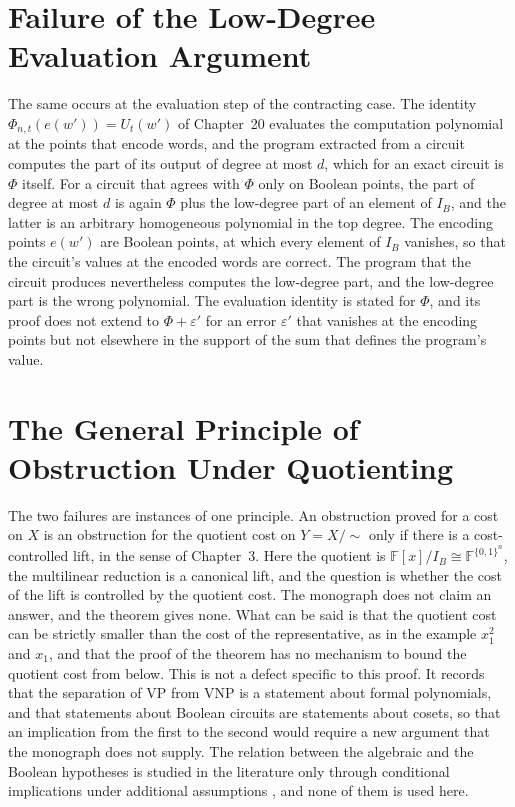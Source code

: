\documentclass[11pt,letterpaper]{report}
\theoremstyle{plain}
\theoremstyle{definition}
\theoremstyle{remark}
\newcommand{\VP}{\mathrm{VP}}
\newcommand{\VNP}{\mathrm{VNP}}
\begin{document}
\section{Failure of the Low-Degree Evaluation Argument}

The same occurs at the evaluation step of the contracting case. The identity $\Phi_{n,t}(e(w'))=U_t(w')$ of Chapter~20 evaluates the computation polynomial at the points that encode words, and the program extracted from a circuit computes the part of its output of degree at most $d$, which for an exact circuit is $\Phi$ itself. For a circuit that agrees with $\Phi$ only on Boolean points, the part of degree at most $d$ is again $\Phi$ plus the low-degree part of an element of $I_B$, and the latter is an arbitrary homogeneous polynomial in the top degree. The encoding points $e(w')$ are Boolean points, at which every element of $I_B$ vanishes, so that the circuit's values at the encoded words are correct. The program that the circuit produces nevertheless computes the low-degree part, and the low-degree part is the wrong polynomial. The evaluation identity is stated for $\Phi$, and its proof does not extend to $\Phi+\varepsilon'$ for an error $\varepsilon'$ that vanishes at the encoding points but not elsewhere in the support of the sum that defines the program's value.

\section{The General Principle of Obstruction Under Quotienting}

The two failures are instances of one principle. An obstruction proved for a cost on $X$ is an obstruction for the quotient cost on $Y=X/{\sim}$ only if there is a cost-controlled lift, in the sense of Chapter~3. Here the quotient is $\mathbb F[x]/I_B\cong\mathbb F^{\{0,1\}^n}$, the multilinear reduction is a canonical lift, and the question is whether the cost of the lift is controlled by the quotient cost. The monograph does not claim an answer, and the theorem gives none. What can be said is that the quotient cost can be strictly smaller than the cost of the representative, as in the example $x_1^2$ and $x_1$, and that the proof of the theorem has no mechanism to bound the quotient cost from below. This is not a defect specific to this proof. It records that the separation of $\VP$ from $\VNP$ is a statement about formal polynomials, and that statements about Boolean circuits are statements about cosets, so that an implication from the first to the second would require a new argument that the monograph does not supply. The relation between the algebraic and the Boolean hypotheses is studied in the literature only through conditional implications under additional assumptions \cite{Burgisser2000b}, and none of them is used here.
\end{document}
